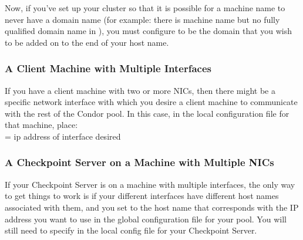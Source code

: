 Now, if you've set up your cluster so that it is possible for a machine
name to never have a domain name (for example: there is machine
name but no fully qualified domain name in ), you must
configure  to be the domain that you wish
to be added on to the end of your host name.


\subsubsection{A Client Machine with Multiple Interfaces}

If you have a client machine with two or more NICs, then there might be
a specific network interface with which you desire a client machine to
communicate with the rest of the Condor pool. In this case, in the local
configuration file for that machine, place: \\ 
 = ip address of interface desired \\


\subsubsection{A Checkpoint Server on a Machine with Multiple NICs}

If your Checkpoint Server is on a machine with multiple interfaces,
the only way to get things to work is if your different interfaces
have different host names associated with them, and you set
 to the host name that corresponds with the
IP address you want to use in the global configuration file for your pool.
You will still need to specify  in the local
config file for your Checkpoint Server.

